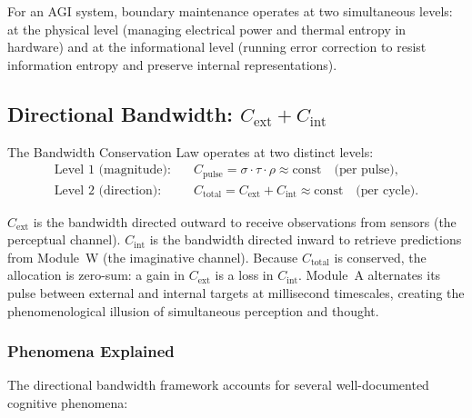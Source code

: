 \documentclass[12pt,a4paper]{article}
\newcommand{\Cext}{C_{\mathrm{ext}}}
\newcommand{\Cint}{C_{\mathrm{int}}}
\begin{document}
For an AGI system, boundary maintenance operates at two simultaneous levels:
at the physical level (managing electrical power and thermal entropy in
hardware) and at the informational level (running error correction to resist
information entropy and preserve internal representations).

\subsection{Directional Bandwidth: $\Cext + \Cint$}

The Bandwidth Conservation Law operates at two distinct levels:
\begin{align}
  \text{Level~1 (magnitude):}\quad
    &C_{\mathrm{pulse}} = \sigma\cdot\tau\cdot\rho \approx \mathrm{const}
     \quad \text{(per pulse)}, \label{eq:L1}\\
  \text{Level~2 (direction):}\quad
    &C_{\mathrm{total}} = \Cext + \Cint \approx \mathrm{const}
     \quad \text{(per cycle)}. \label{eq:L2}
\end{align}

$\Cext$ is the bandwidth directed outward to receive observations from sensors
(the perceptual channel). $\Cint$ is the bandwidth directed inward to retrieve
predictions from Module~W (the imaginative channel). Because $C_{\mathrm{total}}$
is conserved, the allocation is zero-sum: a gain in $\Cext$ is a loss in
$\Cint$. Module~A alternates its pulse between external and internal targets
at millisecond timescales, creating the phenomenological illusion of simultaneous
perception and thought.

\subsubsection{Phenomena Explained}

The directional bandwidth framework accounts for several well-documented
cognitive phenomena:
\end{document}
